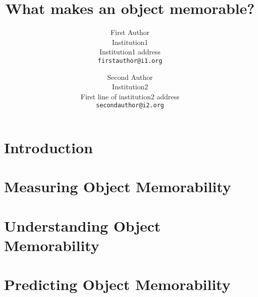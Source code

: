 \documentclass[10pt,twocolumn,letterpaper,draft]{article}
\begin{document}
\title{What makes an object memorable?}

\author{First Author\\
Institution1\\
Institution1 address\\
{\tt\small firstauthor@i1.org}
\and
Second Author\\
Institution2\\
First line of institution2 address\\
{\tt\small secondauthor@i2.org}
}

\maketitle


\begin{abstract}
  
\end{abstract}

\section{Introduction}



\section{Measuring Object Memorability}



\section{Understanding Object Memorability}



\section{Predicting Object Memorability}




{\small


}
\end{document}
